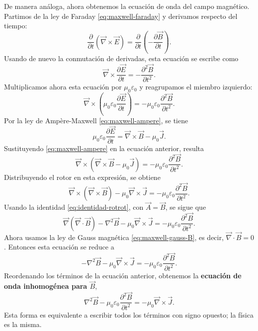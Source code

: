 \documentclass[12pt,a4paper]{article}
\theoremstyle{definition}
\theoremstyle{plain}
\numberwithin{equation}{section}
\theoremstyle{remark}
\newcommand{\E}{\vec{E}}
\newcommand{\B}{\vec{B}}
\newcommand{\J}{\vec{J}}
\begin{document}
De manera análoga, ahora obtenemos la ecuación de onda del campo magnético. Partimos de la ley de Faraday \eqref{eq:maxwell-faraday} y derivamos respecto del tiempo:
\begin{equation*}
    \frac{\partial }{\partial t}\left(\vec \nabla \times \E\right)=\frac{\partial }{\partial t}\left(-\frac{\partial \B}{\partial t}\right).
\end{equation*}
Usando de nuevo la conmutación de derivadas, esta ecuación se escribe como
\begin{equation*}
    \vec \nabla \times \frac{\partial \E}{\partial t}= -\frac{\partial^2 \B}{\partial t^2}.
\end{equation*}
Multiplicamos ahora esta ecuación por $\mu_0\varepsilon_0$ y reagrupamos el miembro izquierdo:
\begin{equation*}
    \vec \nabla \times \left(\mu_0\varepsilon_0\frac{\partial \E}{\partial t}\right)= -\mu_0\varepsilon_0\frac{\partial^2 \B}{\partial t^2}.
\end{equation*}
Por la ley de Ampère-Maxwell \eqref{eq:maxwell-ampere}, se tiene
\begin{equation*}
    \mu_0\varepsilon_0\frac{\partial \E}{\partial t}=\vec\nabla\times\B-\mu_0\J.
\end{equation*}
Sustituyendo \eqref{eq:maxwell-ampere} en la ecuación anterior, resulta
\begin{equation*}
    \vec \nabla \times \left(\vec\nabla\times\B-\mu_0\J\right)= -\mu_0\varepsilon_0\frac{\partial^2 \B}{\partial t^2}.
\end{equation*}
Distribuyendo el rotor en esta expresión, se obtiene
\begin{equation*}
    \vec \nabla \times \left(\vec\nabla\times\B\right)-\mu_0\vec \nabla \times \J= -\mu_0\varepsilon_0\frac{\partial^2 \B}{\partial t^2}.
\end{equation*}
Usando la identidad \eqref{eq:identidad-rotrot}, con $\vec A=\B$, se sigue que
\begin{equation*}
    \vec\nabla(\vec\nabla\cdot\vec B)-\nabla^2\vec B-\mu_0\vec \nabla \times \J= -\mu_0\varepsilon_0\frac{\partial^2 \B}{\partial t^2}.
\end{equation*}
Ahora usamos la ley de Gauss magnética \eqref{eq:maxwell-gauss-B}, es decir, $\vec\nabla\cdot\B=0$. Entonces esta ecuación se reduce a
\begin{equation*}
    -\nabla^2\vec B-\mu_0\vec \nabla \times \J= -\mu_0\varepsilon_0\frac{\partial^2 \B}{\partial t^2}.
\end{equation*}
Reordenando los términos de la ecuación anterior, obtenemos la \textbf{ecuación de onda inhomogénea para $\B$},
\begin{equation*}
    \nabla^2\vec B-\mu_0\varepsilon_0\frac{\partial^2 \B}{\partial t^2}= -\mu_0\vec \nabla \times \J.
\end{equation*}
Esta forma es equivalente a escribir todos los términos con signo opuesto; la física es la misma.
\end{document}
